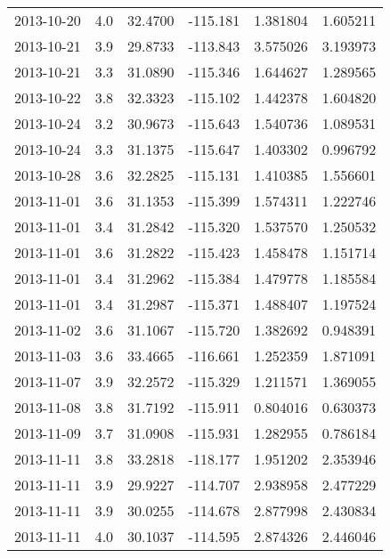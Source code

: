 \begin{tabular}{lrrrrr}
2013-10-20 &       4.0 &  32.4700 &  -115.181 &         1.381804 &         1.605211 \\
2013-10-21 &       3.9 &  29.8733 &  -113.843 &         3.575026 &         3.193973 \\
2013-10-21 &       3.3 &  31.0890 &  -115.346 &         1.644627 &         1.289565 \\
2013-10-22 &       3.8 &  32.3323 &  -115.102 &         1.442378 &         1.604820 \\
2013-10-24 &       3.2 &  30.9673 &  -115.643 &         1.540736 &         1.089531 \\
2013-10-24 &       3.3 &  31.1375 &  -115.647 &         1.403302 &         0.996792 \\
2013-10-28 &       3.6 &  32.2825 &  -115.131 &         1.410385 &         1.556601 \\
2013-11-01 &       3.6 &  31.1353 &  -115.399 &         1.574311 &         1.222746 \\
2013-11-01 &       3.4 &  31.2842 &  -115.320 &         1.537570 &         1.250532 \\
2013-11-01 &       3.6 &  31.2822 &  -115.423 &         1.458478 &         1.151714 \\
2013-11-01 &       3.4 &  31.2962 &  -115.384 &         1.479778 &         1.185584 \\
2013-11-01 &       3.4 &  31.2987 &  -115.371 &         1.488407 &         1.197524 \\
2013-11-02 &       3.6 &  31.1067 &  -115.720 &         1.382692 &         0.948391 \\
2013-11-03 &       3.6 &  33.4665 &  -116.661 &         1.252359 &         1.871091 \\
2013-11-07 &       3.9 &  32.2572 &  -115.329 &         1.211571 &         1.369055 \\
2013-11-08 &       3.8 &  31.7192 &  -115.911 &         0.804016 &         0.630373 \\
2013-11-09 &       3.7 &  31.0908 &  -115.931 &         1.282955 &         0.786184 \\
2013-11-11 &       3.8 &  33.2818 &  -118.177 &         1.951202 &         2.353946 \\
2013-11-11 &       3.9 &  29.9227 &  -114.707 &         2.938958 &         2.477229 \\
2013-11-11 &       3.9 &  30.0255 &  -114.678 &         2.877998 &         2.430834 \\
2013-11-11 &       4.0 &  30.1037 &  -114.595 &         2.874326 &         2.446046 \\

\end{tabular}
